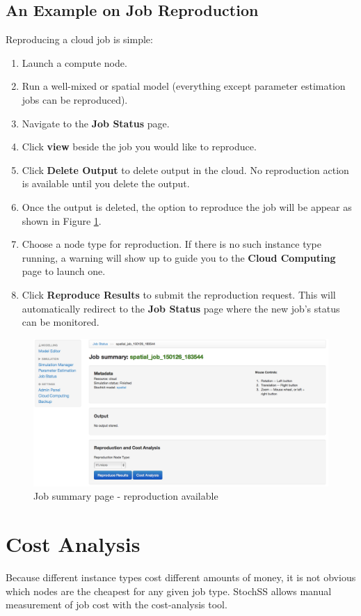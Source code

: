 \subsection{An Example on Job Reproduction}
Reproducing a cloud job is simple:

\begin{enumerate}
\item Launch a compute node.
\item Run a well-mixed or spatial model (everything except parameter estimation jobs can be reproduced).
\item Navigate to the \textbf{Job Status} page.
\item Click \textbf{view} beside the job you would like to reproduce.
\item Click \textbf{Delete Output} to delete output in the cloud. No reproduction action is available until you delete the output.
\item Once the output is deleted, the option to reproduce the job will be appear as shown in Figure \ref{fig:3}.
\item Choose a node type for reproduction. If there is no such instance type running, a warning will show up to guide you to the \textbf{Cloud Computing} page to launch one.
\item Click \textbf{Reproduce Results} to submit the reproduction request. This will automatically redirect to the \textbf{Job Status} page where the new job's status can be monitored.
\end{enumerate}

\begin{figure}[!ht]
\centering
\includegraphics[scale=0.35]{T6/T6_fig_reproduction1.png}
\caption{Job summary page - reproduction available}
\label{fig:3}
\end{figure}

\section{Cost Analysis}
Because different instance types cost different amounts of money, it is not obvious which nodes are the cheapest for any given job type. StochSS allows manual measurement of job cost with the cost-analysis tool.

